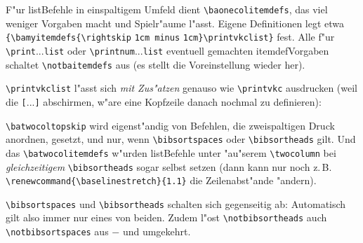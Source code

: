 \documentclass[12pt,a4paper]{article}
\begin{document}
\vspace{1ex}\noindent
F"ur list\hy Befehle in einspaltigem Umfeld dient 
\verb|\baonecolitemdefs|, das viel weniger Vorgaben
macht und Spielr"aume l"asst. Eigene Definitionen
legt etwa 
\verb|{\bamyitemdefs{\rightskip| \verb|1cm minus| \verb|1cm}\printvkclist}|
fest. Alle f"ur \verb|\print|...\verb|list| oder 
\verb|\printnum|...\verb|list| eventuell gemachten itemdef\hy Vorgaben 
schaltet \verb|\notbaitemdefs| aus (es stellt die
Voreinstellung wieder her).

\vspace{1.5ex}\noindent
\verb|\printvkclist| l"asst sich \textit{mit Zus"atzen} 
genauso wie \verb|\printvkc| ausdrucken
(weil die {\small\texttt{[}...\texttt{]}} abschirmen, w"are 
eine Kopfzeile danach nochmal zu definieren):

\vspace{1.ex}{\small\noindent
\verb|   \twocolumn[\printvkctitle\vspace{\batwocoltopskip}] %\markboth|...\\
\verb|   {\small\bibsortheads \batwocolitemdefs\printvkclist}\onecolumn|}

\vspace{1.25ex}\noindent
\verb|\batwocoltopskip| wird eigenst"andig von Befehlen, die 
zweispaltigen Druck anordnen, gesetzt, und nur, wenn 
\verb|\bibsortspaces| oder \verb|\bibsortheads| gilt. 
Und das \verb|\batwocolitemdefs| w"urden list\hy Befehle unter 
"au"serem \verb|\twocolumn| bei \textit{gleichzeitigem} 
\verb|\bibsortheads| sogar selbst setzen (dann kann 
nur noch z.\,B. \verb|\renewcommand{\baselinestretch}{1.1}| 
die Zeilenabst"ande "andern).

\vspace{1.5ex}\noindent
\verb|\bibsortspaces| und \verb|\bibsortheads| schalten sich 
gegenseitig ab: Automatisch gilt also immer nur eines von beiden. 
Zudem l"ost \verb|\notbibsortheads| auch \verb|\notbibsortspaces| 
aus $-$ und umgekehrt.
\end{document}

